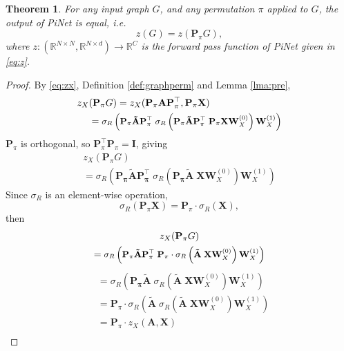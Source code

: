 \documentclass{article}
\newtheorem{theorem}{Theorem}[section]
\renewcommand{\vec}[1]{\mathbf{#1}}
\renewcommand{\P}{\mathbf{P}}
\newcommand{\T}{\top}
\theoremstyle{definition}
\newcommand{\Real}[1]{\mathbb{R}^{#1}}
\begin{document}
\begin{theorem}
  For any input graph $G$, and any permutation $\pi$ applied to $G$, the output of PiNet is equal, i.e.
  \begin{equation}
    z(G) = z( \P_\pi G ),
  \end{equation}
  where $z : (\Real{N \times N}, \Real{N \times d}) \rightarrow \Real{C}$ is the forward pass function of PiNet given in \autoref{eq:z}.
\end{theorem}

\begin{proof}
  By \autoref{eq:zx}, Definition \ref{def:graphperm} and Lemma \ref{lma:pre},
  \begin{align}
    \label{eq:zxstart}
    z_X&(\P_\pi G) = z_X(\P_\pi \vec{A} \P_\pi^\T, \P_\pi \vec{X}) \\
    &= \mbox{\small $\sigma_R \left(\vec{\P_\pi \tilde{A} \P_\pi^\T} \; \sigma_R \left( \vec{\P_\pi \tilde{A} \P_\pi^\T} \;\P_\pi  \vec{X} \vec{W}_X^{(0)} \right) \vec{W}_X^{(1)} \right) $}
  \end{align}
$\P_\pi$ is orthogonal, so $\P_\pi^\T \P_\pi = \vec{I}$, giving
\begin{multline}
    z_X(\P_\pi G) \\
    = \sigma_R \left(\vec{\P_\pi \tilde{A} \P_\pi^\T} \; \sigma_R \left( \vec{\P_\pi \tilde{A} } \; \vec{X} \vec{W}_X^{(0)} \right) \vec{W}_X^{(1)} \right)
\end{multline}
Since $\sigma_R$ is an element-wise operation,
  \begin{equation}
    \sigma_R(\P_\pi \vec{X}) = \P_\pi \cdot \sigma_R(\vec{X}),
  \end{equation}
then
  \begin{multline}
    z_X(\P_\pi G) \\
    = \mbox{\small$ \sigma_R \left(\vec{\P_\pi \tilde{A} \P_\pi^\T} \; \P_\pi \cdot \sigma_R \left( \vec{\tilde{A} } \; \vec{X} \vec{W}_X^{(0)} \right) \vec{W}_X^{(1)} \right)$}
  \end{multline}
  \begin{align}
    \label{eq:zxlater}
    &= \sigma_R \left(\vec{\P_\pi \tilde{A}} \; \sigma_R \left( \vec{\tilde{A} } \; \vec{X} \vec{W}_X^{(0)} \right) \vec{W}_X^{(1)} \right) \\
    &= \P_\pi \cdot \sigma_R \left(\vec{\tilde{A}} \; \sigma_R \left( \vec{\tilde{A} } \; \vec{X} \vec{W}_X^{(0)} \right) \vec{W}_X^{(1)} \right) \\
    &= \P_\pi \cdot z_X(\vec{A}, \vec{X}) \\

\end{align}
\end{proof}
\end{document}
